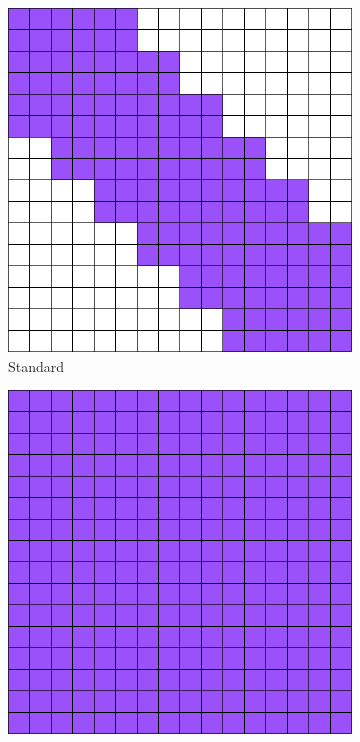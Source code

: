 \documentclass{article}
\begin{document}
\begin{figure}[!htb]
    \centering
    \begin{subfigure}[b]{0.24\linewidth}        %
        \centering
        \includegraphics[width=\linewidth]{Global}
        \caption{Standard}
    \end{subfigure}
    \begin{subfigure}[b]{0.24\linewidth}        %
        \centering
        \includegraphics[width=\linewidth]{B_extraction}

\end{subfigure}
\end{figure}
\end{document}

